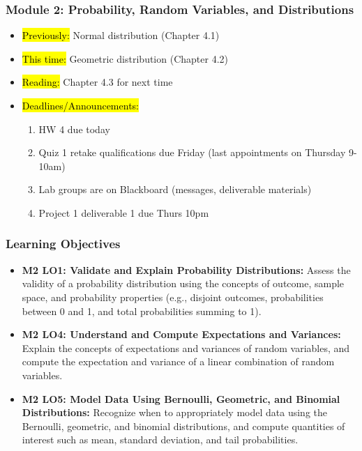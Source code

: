 
\begin{frame}
    \frametitle{Module 2: Probability, Random Variables, and Distributions}
    \begin{itemize}
        \item \hl{Previously: } Normal distribution (Chapter 4.1)
        \item \hl{This time: } Geometric distribution (Chapter 4.2)
        \item \hl{Reading: } Chapter 4.3 for next time
        \item \hl{Deadlines/Announcements: } 
        \begin{enumerate}
            \item HW 4 due today
            \item Quiz 1 retake qualifications due Friday (last appointments on Thursday 9-10am)
            \item Lab groups are on Blackboard (messages, deliverable materials)
            \item Project 1 deliverable 1 due Thurs 10pm
        \end{enumerate}
    \end{itemize}
    
\end{frame}
    
\begin{frame}
    \frametitle{Learning Objectives}
    \begin{itemize}
        \item \textbf{M2 LO1: Validate and Explain Probability Distributions:} Assess the validity of a probability distribution using the concepts of outcome, sample space, and probability properties (e.g., disjoint outcomes, probabilities between 0 and 1, and total probabilities summing to 1).
        \item \textbf{M2 LO4: Understand and Compute Expectations and Variances:} Explain the concepts of expectations and variances of random variables, and compute the expectation and variance of a linear combination of random variables.
        \item \textbf{M2 LO5: Model Data Using Bernoulli, Geometric, and Binomial Distributions:} Recognize when to appropriately model data using the Bernoulli, geometric, and binomial distributions, and compute quantities of interest such as mean, standard deviation, and tail probabilities.
    \end{itemize}
\end{frame}

